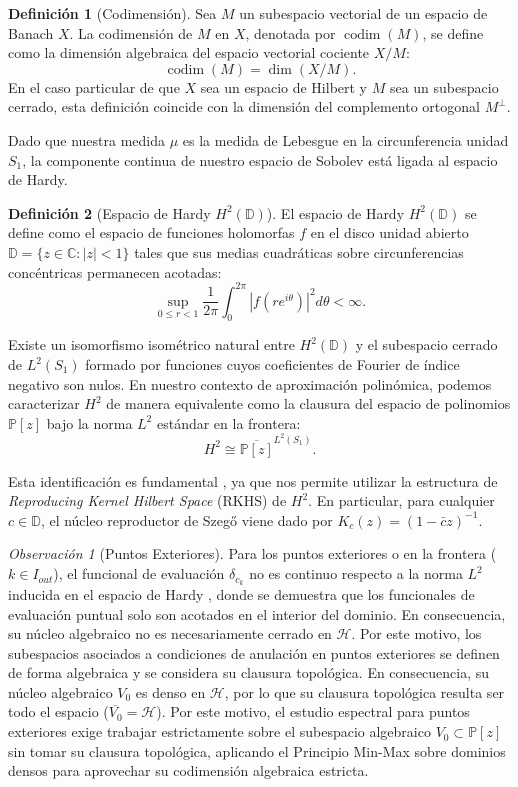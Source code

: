 \documentclass[12pt,a4paper]{article}
\theoremstyle{definition}
\newtheorem{definicion}{Definición}
\theoremstyle{remark}
\newtheorem{observacion}{Observación}
\newcommand{\C}{\mathbb{C}}
\newcommand{\Poly}{\mathbb{P}[z]}
\newcommand{\abs}[1]{\left| #1 \right|}
\begin{document}
\begin{definicion}[Codimensión]
    Sea $M$ un subespacio vectorial de un espacio de Banach $X$. La codimensión de $M$ en $X$, denotada por $\operatorname{codim}(M)$, se define como la dimensión algebraica del espacio vectorial cociente $X/M$:
    $$ \operatorname{codim}(M) = \dim(X/M). $$
    En el caso particular de que $X$ sea un espacio de Hilbert y $M$ sea un subespacio cerrado, esta definición coincide con la dimensión del complemento ortogonal $M^\perp$\cite{halmos1982hilbert}.
\end{definicion}

Dado que nuestra medida $\mu$ es la medida de Lebesgue en la circunferencia unidad $S_1$, la componente continua de nuestro espacio de Sobolev está ligada al espacio de Hardy\cite{duren1970theory}.

\begin{definicion}[Espacio de Hardy $H^2(\mathbb{D})$]
    El espacio de Hardy $H^2(\mathbb{D})$ se define como el espacio de funciones holomorfas $f$ en el disco unidad abierto $\mathbb{D} = \{z \in \C : \abs{z} < 1\}$ tales que sus medias cuadráticas sobre circunferencias concéntricas permanecen acotadas:
    $$ \sup_{0 \le r < 1} \frac{1}{2\pi} \int_{0}^{2\pi} \abs{f(re^{i\theta})}^2 d\theta < \infty. $$
\end{definicion}

Existe un isomorfismo isométrico natural entre $H^2(\mathbb{D})$ y el subespacio cerrado de $L^2(S_1)$ formado por funciones cuyos coeficientes de Fourier de índice negativo son nulos. En nuestro contexto de aproximación polinómica, podemos caracterizar $H^2$ de manera equivalente como la clausura del espacio de polinomios $\Poly$ bajo la norma $L^2$ estándar en la frontera:
$$ H^2 \cong \overline{\Poly}^{L^2(S_1)}. $$

Esta identificación es fundamental , ya que nos permite utilizar la estructura de \textit{Reproducing Kernel Hilbert Space} (RKHS) de $H^2$. En particular, para cualquier $c \in \mathbb{D}$, el núcleo reproductor de Szegő viene dado por $K_c(z) = (1-\bar{c}z)^{-1}$.

\begin{observacion}[Puntos Exteriores]
    Para los puntos exteriores o en la frontera ($k \in I_{out}$), el funcional de evaluación $\delta_{c_k}$ no es continuo respecto a la norma $L^2$ inducida en el espacio de Hardy \cite{duren1970theory}, donde se demuestra que los funcionales de evaluación puntual solo son acotados en el interior del dominio. En consecuencia, su núcleo algebraico no es necesariamente cerrado en $\mathcal{H}$. Por este motivo, los subespacios asociados a condiciones de anulación en puntos exteriores se definen de forma algebraica y se considera su clausura topológica. En consecuencia, su núcleo algebraico $V_0$ es denso en $\mathcal{H}$, por lo que su clausura topológica resulta ser todo el espacio ($\overline{V_0} = \mathcal{H}$). Por este motivo, el estudio espectral para puntos exteriores exige trabajar estrictamente sobre el subespacio algebraico $V_0 \subset \mathbb{P}[z]$ sin tomar su clausura topológica, aplicando el Principio Min-Max sobre dominios densos para aprovechar su codimensión algebraica estricta.
\end{observacion}
\end{document}
